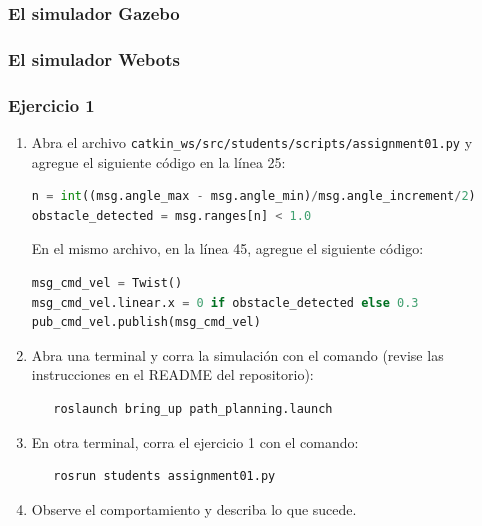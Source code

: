\begin{frame}\frametitle{El simulador Gazebo}
  
\end{frame}

\begin{frame}\frametitle{El simulador Webots}
\end{frame}

\begin{frame}[containsverbatim]\frametitle{Ejercicio 1}
  \begin{enumerate}
  \item Abra el archivo \texttt{catkin\_ws/src/students/scripts/assignment01.py} y agregue el siguiente código en la línea 25:
    \begin{lstlisting}[language=Python,firstnumber=25]
n = int((msg.angle_max - msg.angle_min)/msg.angle_increment/2)
obstacle_detected = msg.ranges[n] < 1.0
  \end{lstlisting}
  En el mismo archivo, en la línea 45, agregue el siguiente código:
  \begin{lstlisting}[language=Python,firstnumber=45]
msg_cmd_vel = Twist()
msg_cmd_vel.linear.x = 0 if obstacle_detected else 0.3
pub_cmd_vel.publish(msg_cmd_vel)
  \end{lstlisting}
  \item Abra una terminal y corra la simulación con el comando (revise las instrucciones en el README del repositorio):
    \begin{verbatim}
   roslaunch bring_up path_planning.launch
\end{verbatim}
  \item En otra terminal, corra el ejercicio 1 con el comando:
\begin{verbatim}
   rosrun students assignment01.py
\end{verbatim}
  \item Observe el comportamiento y describa lo que sucede. 
  \end{enumerate}
\end{frame}



